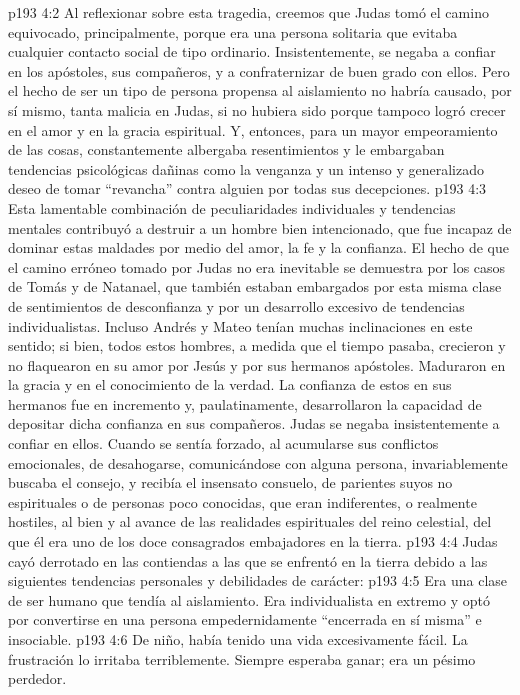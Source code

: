 \vs p193 4:2 Al reflexionar sobre esta tragedia, creemos que Judas tomó el camino equivocado, principalmente, porque era una persona solitaria que evitaba cualquier contacto social de tipo ordinario. Insistentemente, se negaba a confiar en los apóstoles, sus compañeros, y a confraternizar de buen grado con ellos. Pero el hecho de ser un tipo de persona propensa al aislamiento no habría causado, por sí mismo, tanta malicia en Judas, si no hubiera sido porque tampoco logró crecer en el amor y en la gracia espiritual. Y, entonces, para un mayor empeoramiento de las cosas, constantemente albergaba resentimientos y le embargaban tendencias psicológicas dañinas como la venganza y un intenso y generalizado deseo de tomar “revancha” contra alguien por todas sus decepciones.
\vs p193 4:3 Esta lamentable combinación de peculiaridades individuales y tendencias mentales contribuyó a destruir a un hombre bien intencionado, que fue incapaz de dominar estas maldades por medio del amor, la fe y la confianza. El hecho de que el camino erróneo tomado por Judas no era inevitable se demuestra por los casos de Tomás y de Natanael, que también estaban embargados por esta misma clase de sentimientos de desconfianza y por un desarrollo excesivo de tendencias individualistas. Incluso Andrés y Mateo tenían muchas inclinaciones en este sentido; si bien, todos estos hombres, a medida que el tiempo pasaba, crecieron y no flaquearon en su amor por Jesús y por sus hermanos apóstoles. Maduraron en la gracia y en el conocimiento de la verdad. La confianza de estos en sus hermanos fue en incremento y, paulatinamente, desarrollaron la capacidad de depositar dicha confianza en sus compañeros. Judas se negaba insistentemente a confiar en ellos. Cuando se sentía forzado, al acumularse sus conflictos emocionales, de desahogarse, comunicándose con alguna persona, invariablemente buscaba el consejo, y recibía el insensato consuelo, de parientes suyos no espirituales o de personas poco conocidas, que eran indiferentes, o realmente hostiles, al bien y al avance de las realidades espirituales del reino celestial, del que él era uno de los doce consagrados embajadores en la tierra.
\vs p193 4:4 Judas cayó derrotado en las contiendas a las que se enfrentó en la tierra debido a las siguientes tendencias personales y debilidades de carácter:
\vs p193 4:5 Era una clase de ser humano que tendía al aislamiento. Era individualista en extremo y optó por convertirse en una persona empedernidamente “encerrada en sí misma” e insociable.
\vs p193 4:6 De niño, había tenido una vida excesivamente fácil. La frustración lo irritaba terriblemente. Siempre esperaba ganar; era un pésimo perdedor.

